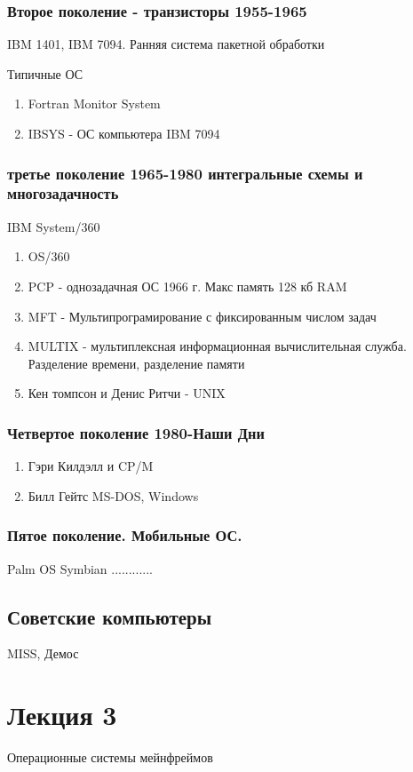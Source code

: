 \documentclass[a4paper]{article}
\begin{document}
\subsubsection{Второе поколение - транзисторы 1955-1965}
IBM 1401,
IBM 7094.
Ранняя система пакетной обработки

Типичные ОС
\begin{enumerate}
\item Fortran Monitor System
\item IBSYS - ОС компьютера IBM 7094
\end{enumerate}

\subsubsection{третье поколение 1965-1980 интегральные схемы и многозадачность}
IBM System/360

\begin{enumerate}
\item OS/360
\item PCP - однозадачная ОС 1966 г. Макс память 128 кб RAM
\item MFT - Мультипрограмирование с фиксированным числом задач
\item MULTIX - мультиплексная информационная вычислительная служба. Разделение времени, разделение памяти
\item Кен томпсон и Денис Ритчи - UNIX
\end{enumerate}

\subsubsection{Четвертое поколение 1980-Наши Дни}
\begin{enumerate}
\item Гэри Килдэлл и CP/M
\item Билл Гейтс MS-DOS, Windows
\end{enumerate}

\subsubsection{Пятое поколение. Мобильные ОС.}
Palm OS
Symbian
............

\subsection{Советские компьютеры}
MISS, Демос

\section{Лекция 3}
Операционные системы мейнфреймов
\end{document}
